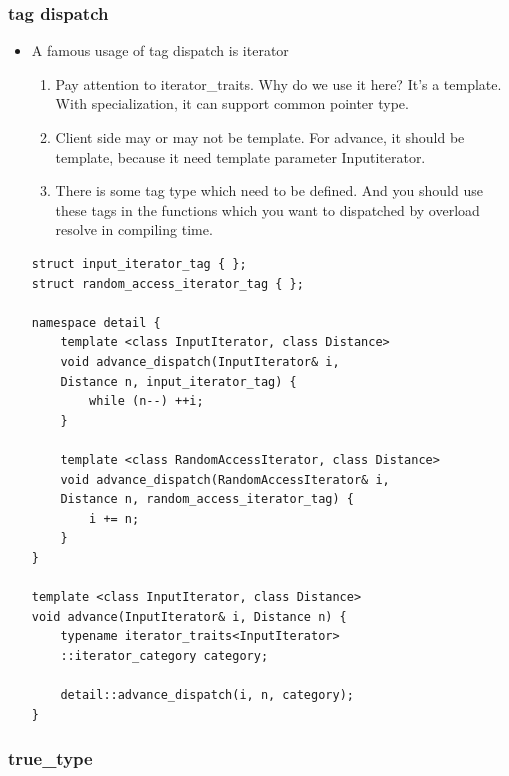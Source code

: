 \documentclass[a4paper,11pt,twoside]{book}
\begin{document}
\subsubsection{tag dispatch}
\begin{itemize}
	\item A famous usage of tag dispatch is iterator 
	\begin{enumerate}
		\item Pay attention to iterator\_traits. Why do we use it here? It's a template. With specialization, it can support common pointer type.
		
		\item Client side may or may not be template. For advance, it should be template, because it need template parameter Inputiterator.
		
		\item There is some tag type which need to be defined. And you should use these tags in the functions which you want to dispatched by overload resolve in compiling time. 
	\end{enumerate}
\begin{lstlisting}[numbers=none]
struct input_iterator_tag { };
struct random_access_iterator_tag { };

namespace detail {
	template <class InputIterator, class Distance>
	void advance_dispatch(InputIterator& i, 
	Distance n, input_iterator_tag) {
		while (n--) ++i;
	}
	
	template <class RandomAccessIterator, class Distance>
	void advance_dispatch(RandomAccessIterator& i,
	Distance n, random_access_iterator_tag) {
		i += n;
	}
}

template <class InputIterator, class Distance>
void advance(InputIterator& i, Distance n) {
	typename iterator_traits<InputIterator>
	::iterator_category category;
	
	detail::advance_dispatch(i, n, category);
}	
\end{lstlisting}	

\end{itemize}

\subsubsection{true\_type}
\end{document}
